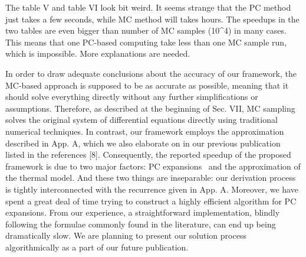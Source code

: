 \begin{reviewer}
The table V and table VI look  bit weird.  It seems strange that the PC method just takes a few seconds, while MC method will takes hours. The speedups in the two tables  are even bigger than number of MC samples (10\^{}4) in many cases. This means that one PC-based computing take less than one MC sample run, which is impossible.  More explanations are needed.
\end{reviewer}
\begin{authors}
In order to draw adequate conclusions about the accuracy of our framework, the MC-based approach is supposed to be as accurate as possible, meaning that it should solve everything directly without any further simplifications or assumptions.
Therefore, as described at the beginning of Sec. VII, MC sampling solves the original system of differential equations directly using traditional numerical techniques.
In contrast, our framework employs the approximation described in App. A, which we also elaborate on in our previous publication listed in the references [8].
Consequently, the reported speedup of the proposed framework is due to two major factors: PC expansions \perse\ and the approximation of the thermal model.
And these two things are inseparable: our derivation process is tightly interconnected with the recurrence given in App. A.
Moreover, we have spent a great deal of time trying to construct a highly efficient algorithm for PC expansions.
From our experience, a straightforward implementation, blindly following the formulae commonly found in the literature, can end up being dramatically slow.
We are planning to present our solution process algorithmically as a part of our future publication.
\end{authors}
